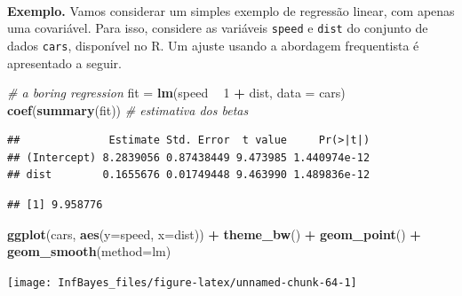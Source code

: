\documentclass[
]{book}
\newenvironment{Shaded}{\begin{snugshade}}{\end{snugshade}}
\newcommand{\CommentTok}[1]{\textcolor[rgb]{0.56,0.35,0.01}{\textit{#1}}}
\newcommand{\DataTypeTok}[1]{\textcolor[rgb]{0.13,0.29,0.53}{#1}}
\newcommand{\DecValTok}[1]{\textcolor[rgb]{0.00,0.00,0.81}{#1}}
\newcommand{\KeywordTok}[1]{\textcolor[rgb]{0.13,0.29,0.53}{\textbf{#1}}}
\newcommand{\NormalTok}[1]{#1}
\newcommand{\OperatorTok}[1]{\textcolor[rgb]{0.81,0.36,0.00}{\textbf{#1}}}
\newcommand{\StringTok}[1]{\textcolor[rgb]{0.31,0.60,0.02}{#1}}
\begin{document}
\(~\)

\textbf{Exemplo.} Vamos considerar um simples exemplo de regressão linear, com apenas uma covariável. Para isso, considere as variáveis \texttt{speed} e \texttt{dist} do conjunto de dados \texttt{cars}, disponível no R. Um ajuste usando a abordagem frequentista é apresentado a seguir.

\begin{Shaded}
\begin{Highlighting}[]
\CommentTok{# a boring regression}
\NormalTok{fit =}\StringTok{ }\KeywordTok{lm}\NormalTok{(speed }\OperatorTok{~}\StringTok{ }\DecValTok{1} \OperatorTok{+}\StringTok{ }\NormalTok{dist, }\DataTypeTok{data =}\NormalTok{ cars)}
\KeywordTok{coef}\NormalTok{(}\KeywordTok{summary}\NormalTok{(fit)) }\CommentTok{# estimativa dos betas}
\end{Highlighting}
\end{Shaded}

\begin{verbatim}
##              Estimate Std. Error  t value     Pr(>|t|)
## (Intercept) 8.2839056 0.87438449 9.473985 1.440974e-12
## dist        0.1655676 0.01749448 9.463990 1.489836e-12
\end{verbatim}

\begin{Shaded}
\end{Shaded}

\begin{verbatim}
## [1] 9.958776
\end{verbatim}

\begin{Shaded}
\begin{Highlighting}[]
\KeywordTok{ggplot}\NormalTok{(cars, }\KeywordTok{aes}\NormalTok{(}\DataTypeTok{y=}\NormalTok{speed, }\DataTypeTok{x=}\NormalTok{dist)) }\OperatorTok{+}\StringTok{ }\KeywordTok{theme_bw}\NormalTok{() }\OperatorTok{+}
\StringTok{  }\KeywordTok{geom_point}\NormalTok{() }\OperatorTok{+}\StringTok{ }\KeywordTok{geom_smooth}\NormalTok{(}\DataTypeTok{method=}\NormalTok{lm)}
\end{Highlighting}
\end{Shaded}

\begin{center}\texttt{[image: InfBayes\_files/figure-latex/unnamed-chunk-64-1]} \end{center}
\end{document}
